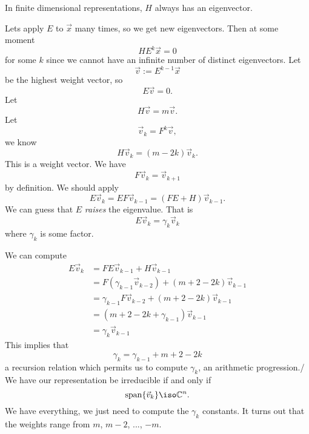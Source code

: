 \begin{rmk}
In finite dimensional representations, $H$ always has an eigenvector.
\end{rmk}

Lets apply $E$ to $\vec{x}$ many times, so we get new
eigenvectors. Then at some moment
\begin{equation}
HE^{k}\vec{x}=0
\end{equation}
for some $k$ since we cannot have an infinite number of distinct
eigenvectors. Let
\begin{equation}
\vec{v}:=E^{k-1}\vec{x}
\end{equation}
be the highest weight vector, so
\begin{equation}
E\vec{v}=0.
\end{equation}
Let
\begin{equation}
H\vec{v}=m\vec{v}.
\end{equation}
Let
\begin{equation}
\vec{v}_{k}=F^{k}\vec{v},
\end{equation}
we know
\begin{equation}
H\vec{v}_{k}=(m-2k)\vec{v}_{k}.
\end{equation}
This is a weight vector. We have
\begin{equation}
F\vec{v}_{k}=\vec{v}_{k+1}
\end{equation}
by definition. We should apply
\begin{equation}
E\vec{v}_{k}=EF\vec{v}_{k-1}=(FE+H)\vec{v}_{k-1}.
\end{equation}
We can guess that $E$ \emph{raises} the eigenvalue. That is
\begin{equation}
E\vec{v}_{k}=\gamma_{k}\vec{v}_{k}
\end{equation}
where $\gamma_{k}$ is some factor.

We can compute
\begin{subequations}
\begin{align}
E\vec{v}_{k} &= FE\vec{v}_{k-1}+H\vec{v}_{k-1}\\
&= F(\gamma_{k-1}\vec{v}_{k-2})+(m+2-2k)\vec{v}_{k-1}\\
&= \gamma_{k-1}F\vec{v}_{k-2}+(m+2-2k)\vec{v}_{k-1}\\
&= (m+2-2k+\gamma_{k-1})\vec{v}_{k-1}\\
&= \gamma_{k}\vec{v}_{k-1}
\end{align}
\end{subequations}
This implies that
\begin{equation}
\gamma_{k}=\gamma_{k-1}+m+2-2k
\end{equation}
a recursion relation which permits us to compute $\gamma_{k}$, an
arithmetic progression./ We have our representation be
irreducible if and only if
\begin{equation}
{\rm span}\{\vec{v}_{k}\}\iso\Bbb{C}^{n}.
\end{equation}
We have everything, we just need to compute the $\gamma_{k}$
constants. It turns out that the weights range from $m$, $m-2$,
..., $-m$.
